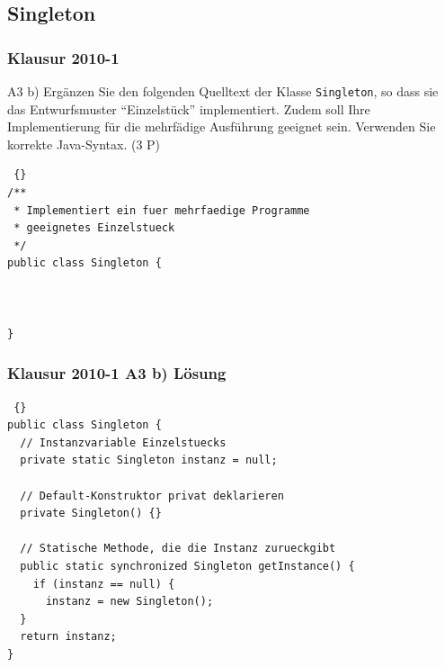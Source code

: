 

\subsection{Singleton}
\begin{frame}[fragile]
\frametitle {Klausur 2010-1} 
	\begin{block} {A3 b)}
	Ergänzen Sie den folgenden Quelltext der Klasse \texttt{Singleton}, so dass sie das Entwurfsmuster ``Einzelstück'' implementiert. Zudem soll Ihre Implementierung für die mehrfädige Ausführung geeignet sein. Verwenden Sie korrekte Java-Syntax. (3 P)
	\end{block}
	
	\begin{lstlisting} {}
/**
 * Implementiert ein fuer mehrfaedige Programme 
 * geeignetes Einzelstueck
 */
public class Singleton {



}
	\end{lstlisting}
\end{frame}

\begin{frame}[fragile]
\frametitle {Klausur 2010-1 A3 b) Lösung} 
	
	\begin{lstlisting} {}
public class Singleton {
  // Instanzvariable Einzelstuecks
  private static Singleton instanz = null;
  
  // Default-Konstruktor privat deklarieren
  private Singleton() {}
  
  // Statische Methode, die die Instanz zurueckgibt
  public static synchronized Singleton getInstance() {
    if (instanz == null) {
      instanz = new Singleton();
  }
  return instanz;
}
	\end{lstlisting}
\end{frame}


